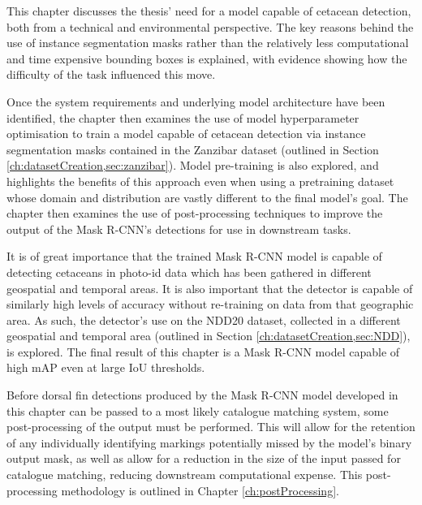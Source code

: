 This chapter discusses the thesis' need for a model capable of cetacean detection, both from a technical and environmental perspective. The key reasons behind the use of instance segmentation masks rather than the relatively less computational and time expensive bounding boxes is explained, with evidence showing how the difficulty of the task influenced this move. 

Once the system requirements and underlying model architecture have been identified, the chapter then examines the use of model hyperparameter optimisation to train a model capable of cetacean detection via instance segmentation masks contained in the Zanzibar dataset (outlined in Section \ref{ch:datasetCreation,sec:zanzibar}). Model pre-training is also explored, and highlights the benefits of this approach even when using a pretraining dataset whose domain and distribution are vastly different to the final model's goal. The chapter then examines the use of post-processing techniques to improve the output of the Mask R-CNN's detections for use in downstream tasks. 

It is of great importance that the trained Mask R-CNN model is capable of detecting cetaceans in photo-id data which has been gathered in different geospatial and temporal areas. It is also important that the detector is capable of similarly high levels of accuracy without re-training on data from that geographic area. As such, the detector's use on the NDD20 dataset, collected in a different geospatial and temporal area (outlined in Section \ref{ch:datasetCreation,sec:NDD}), is explored. The final result of this chapter is a Mask R-CNN model capable of high mAP even at large IoU thresholds. 

Before dorsal fin detections produced by the Mask R-CNN model developed in this chapter can be passed to a most likely catalogue matching system, some post-processing of the output must be performed. This will allow for the retention of any individually identifying markings potentially missed by the model's binary output mask, as well as allow for a reduction in the size of the input passed for catalogue matching, reducing downstream computational expense. This post-processing methodology is outlined in Chapter \ref{ch:postProcessing}.

